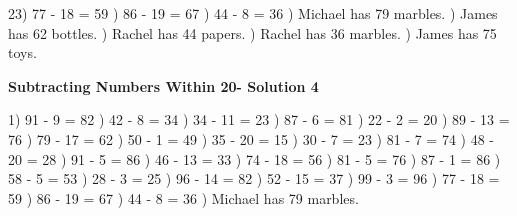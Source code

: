 \documentclass{article}%
\begin{document}
23) 77 {-} 18 = 59%
) 86 {-} 19 = 67%
) 44 {-} 8 = 36%
) Michael has 79 marbles.%
) James has 62 bottles.%
) Rachel has 44 papers.%
) Rachel has 36 marbles.%
) James has 75 toys.%
\newline%
\newpage%
\large%
\begin{center}%
\textbf{Subtracting Numbers Within 20- Solution 4}%
\newline%
\end{center} \normalsize%
1) 91 {-} 9 = 82%
) 42 {-} 8 = 34%
) 34 {-} 11 = 23%
) 87 {-} 6 = 81%
) 22 {-} 2 = 20%
) 89 {-} 13 = 76%
) 79 {-} 17 = 62%
) 50 {-} 1 = 49%
) 35 {-} 20 = 15%
) 30 {-} 7 = 23%
) 81 {-} 7 = 74%
) 48 {-} 20 = 28%
) 91 {-} 5 = 86%
) 46 {-} 13 = 33%
) 74 {-} 18 = 56%
) 81 {-} 5 = 76%
) 87 {-} 1 = 86%
) 58 {-} 5 = 53%
) 28 {-} 3 = 25%
) 96 {-} 14 = 82%
) 52 {-} 15 = 37%
) 99 {-} 3 = 96%
) 77 {-} 18 = 59%
) 86 {-} 19 = 67%
) 44 {-} 8 = 36%
) Michael has 79 marbles.%
\newline%
\end{document}
